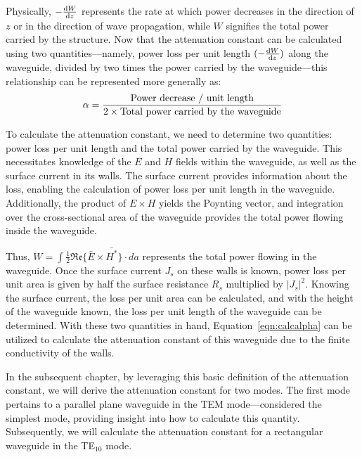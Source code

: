 Physically, $-\dv{W}{z}$ represents the rate at which power decreases in the direction of $z$ or in the direction of wave propagation, while $W$ signifies the total power carried by the structure. Now that the attenuation constant can be calculated using two quantities—namely, power loss per unit length $(-\dv{W}{z})$ along the waveguide, divided by two times the power carried by the waveguide—this relationship can be represented more generally as:
\begin{dmath}
\alpha = \frac{\textnormal{Power decrease / unit length}}{2\times \textnormal{Total power carried by the waveguide}}
\end{dmath}

To calculate the attenuation constant, we need to determine two quantities: power loss per unit length and the total power carried by the waveguide. This necessitates knowledge of the $E$ and $H$ fields within the waveguide, as well as the surface current in its walls. The surface current provides information about the loss, enabling the calculation of power loss per unit length in the waveguide. Additionally, the product of $E\times H$ yields the Poynting vector, and integration over the cross-sectional area of the waveguide provides the total power flowing inside the waveguide.

Thus, $W = \int\frac{1}{2}\mathfrak{Re}\{\bar{E}\times\bar{H^*}\}\cdot{da}$ represents the total power flowing in the waveguide. Once the surface current $J_{s}$ on these walls is known, power loss per unit area is given by half the surface resistance $R_s$ multiplied by $|J_{s}|^{2}$. Knowing the surface current, the loss per unit area can be calculated, and with the height of the waveguide known, the loss per unit length of the waveguide can be determined. With these two quantities in hand, Equation~\eqref{eqn:calcalpha} can be utilized to calculate the attenuation constant of this waveguide due to the finite conductivity of the walls.

In the subsequent chapter, by leveraging this basic definition of the attenuation constant, we will derive the attenuation constant for two modes. The first mode pertains to a parallel plane waveguide in the TEM mode—considered the simplest mode, providing insight into how to calculate this quantity. Subsequently, we will calculate the attenuation constant for a rectangular waveguide in the TE$_{10}$ mode.

